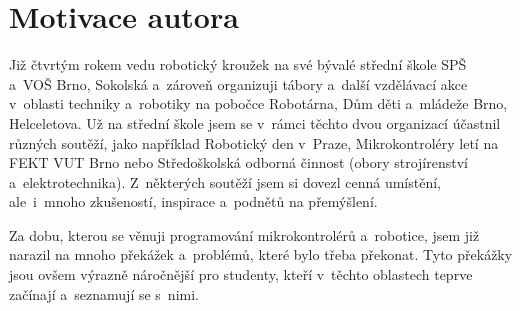 
\addtocounter{footnote}{-1} %



%

\section{Motivace autora}

Již čtvrtým rokem vedu robotický kroužek na své bývalé střední škole SPŠ a~VOŠ Brno, Sokolská a~zároveň organizuji tábory a~další vzdělávací akce v~oblasti techniky a~robotiky na pobočce Robotárna, Dům děti a~mládeže Brno, Helceletova.
Už na střední škole jsem se v~rámci těchto dvou organizací účastnil různých soutěží, jako například Robotický den v~Praze, Mikrokontroléry letí na FEKT VUT Brno nebo Středoškolská odborná činnost (obory strojírenství a~elektrotechnika). 
Z~některých soutěží jsem si dovezl cenná umístění, ale~i~mnoho zkušeností, inspirace a~podnětů na přemýšlení.


Za dobu, kterou se věnuji programování mikrokontrolérů a~robotice, jsem již narazil na mnoho překážek a~problémů, které bylo třeba překonat. 
Tyto překážky jsou ovšem výrazně náročnější pro studenty, kteří v~těchto oblastech teprve začínají a~seznamují se s~nimi. 

